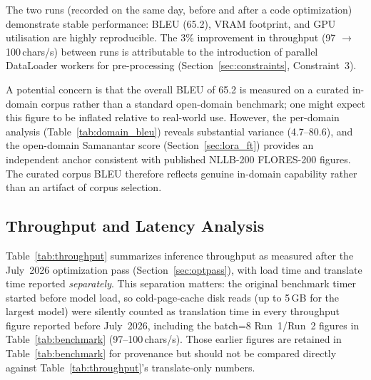\documentclass[conference]{IEEEtran}
\begin{document}
The two runs (recorded on the same day, before and after a code optimization)
demonstrate stable performance: BLEU (65.2), VRAM footprint, and GPU utilisation are
highly reproducible. The 3\% improvement in throughput (97 $\to$ 100\,chars/s)
between runs is attributable to the introduction of parallel DataLoader workers
for pre-processing (Section~\ref{sec:constraints}, Constraint~3).

A potential concern is that the overall BLEU of 65.2 is measured on a curated
in-domain corpus rather than a standard open-domain benchmark; one might expect
this figure to be inflated relative to real-world use.
However, the per-domain analysis (Table~\ref{tab:domain_bleu}) reveals substantial
variance (4.7--80.6), and the open-domain Samanantar score (Section~\ref{sec:lora_ft}) provides
an independent anchor consistent with published NLLB-200 FLORES-200 figures.
The curated corpus BLEU therefore reflects genuine in-domain capability rather than
an artifact of corpus selection.

\subsection{Throughput and Latency Analysis}

Table~\ref{tab:throughput} summarizes inference throughput as measured after the
July~2026 optimization pass (Section~\ref{sec:optpass}), with load time and
translate time reported \emph{separately}. This separation matters: the original
benchmark timer started before model load, so cold-page-cache disk reads (up to
5\,GB for the largest model) were silently counted as translation time in every
throughput figure reported before July~2026, including the batch=8 Run~1/Run~2
figures in Table~\ref{tab:benchmark} (97--100\,chars/s). Those earlier figures are
retained in Table~\ref{tab:benchmark} for provenance but should not be compared
directly against Table~\ref{tab:throughput}'s translate-only numbers.
\end{document}
